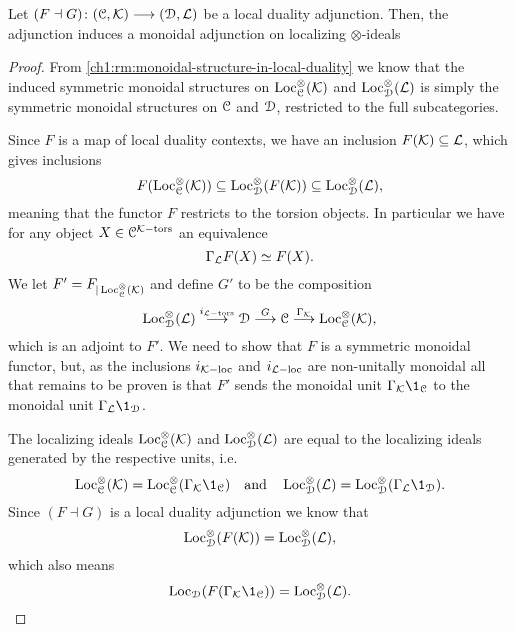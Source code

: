 \begin{lemma}
    \label{ch1:lm:induced-torsion-adjunction}
    Let $(F\dashv G)\colon (\EuScript{C}, \mathcal{K})\longrightarrow (\EuScript{D}, \mathcal{L})$ be a local duality adjunction. Then, the adjunction induces a monoidal adjunction on localizing $\otimes$-ideals
    \begin{center}
    \end{center}
\end{lemma}
\begin{proof}
    From \cref{ch1:rm:monoidal-structure-in-local-duality} we know that the induced symmetric monoidal structures on $\operatorname{Loc}^\otimes_{\EuScript{C}}(\mathcal{K})$ and $\operatorname{Loc}^\otimes_{\EuScript{D}}(\mathcal{L})$ is simply the symmetric monoidal structures on $\EuScript{C}$ and $\EuScript{D}$, restricted to the full subcategories. 
    
    Since $F$ is a map of local duality contexts, we have an inclusion $F(\mathcal{K})\subseteq \mathcal{L}$, which gives inclusions  
    \[F(\operatorname{Loc}^\otimes_{\EuScript{C}}(\mathcal{K}))\subseteq \operatorname{Loc}^\otimes_{\EuScript{D}}(F(\mathcal{K}))\subseteq \operatorname{Loc}^\otimes_{\EuScript{D}}(\mathcal{L}),\]
    meaning that the functor $F$ restricts to the torsion objects. In particular we have for any object $X\in \EuScript{C}^{\mathcal{K}-\mathrm{tors}}$ an equivalence 
    \[\Gamma_{\mathcal{L}} F(X) \simeq F(X).\] 
    We let $F'=F_{|\operatorname{Loc}^\otimes_{\EuScript{C}}(\mathcal{K})}$ and define $G'$ to be the composition 
    \[\operatorname{Loc}^{\otimes}_{\EuScript{D}}(\mathcal{L})\overset{i_{\mathcal{L}-\mathrm{tors}}}\longrightarrow \EuScript{D}\overset{G}\longrightarrow \EuScript{C}\overset{\Gamma_{\mathcal{K}}}\longrightarrow \operatorname{Loc}_{\EuScript{C}}^{\otimes}(\mathcal{K}),\]
    which is an adjoint to $F'$. We need to show that $F$ is a symmetric monoidal functor, but, as the inclusions $i_{\mathcal{K}-\mathrm{loc}}$ and $i_{\mathcal{L}-\mathrm{loc}}$ are non-unitally monoidal all that remains to be proven is that $F'$ sends the monoidal unit $\Gamma_\K \1_\C$ to the monoidal unit $\Gamma_\L \1_\D$. 

    The localizing ideals $\operatorname{Loc}_{\EuScript{C}}^\otimes(\mathcal{K})$ and $\operatorname{Loc}_{\EuScript{D}}^\otimes(\mathcal{L})$ are equal to the localizing ideals generated by the respective units, i.e. 
    \[\Loc_\C^\otimes(\K) = \Loc_\C^\otimes(\Gamma_\K\1_\C) \quad \text{and}\quad \Loc_\D^\otimes(\L) = \Loc_\D^\otimes(\Gamma_\L\1_\D).\]
    Since $(F\dashv G)$ is a local duality adjunction we know that 
    \[\operatorname{Loc}^\otimes_{\EuScript{D}}(F(\mathcal{K}))= \operatorname{Loc}_{\EuScript{D}}^\otimes(\mathcal{L}),\] 
    which also means 
    \[\Loc_\D(F(\Gamma_\K \1_\C)) = \Loc_\D^\otimes(\L).\]


\end{proof}
